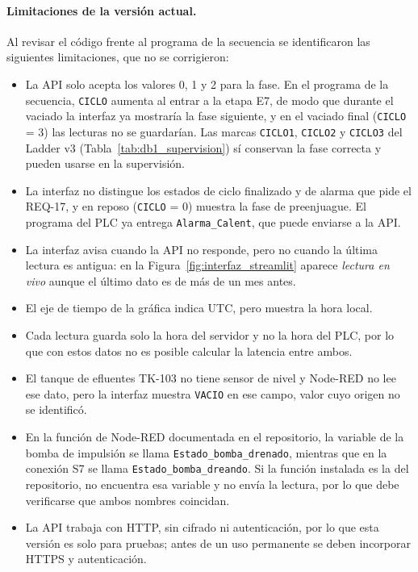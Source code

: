\paragraph{Limitaciones de la versión actual.} Al revisar el código frente al programa de la secuencia se identificaron las siguientes limitaciones, que no se corrigieron:
\begin{itemize}
\item La API solo acepta los valores 0, 1 y 2 para la fase. En el programa de la secuencia, \texttt{CICLO} aumenta al entrar a la etapa E7, de modo que durante el vaciado la interfaz ya mostraría la fase siguiente, y en el vaciado final (\texttt{CICLO} = 3) las lecturas no se guardarían. Las marcas \texttt{CICLO1}, \texttt{CICLO2} y \texttt{CICLO3} del Ladder v3 (Tabla~\ref{tab:db1_supervision}) sí conservan la fase correcta y pueden usarse en la supervisión.
\item La interfaz no distingue los estados de ciclo finalizado y de alarma que pide el REQ-17, y en reposo (\texttt{CICLO} = 0) muestra la fase de preenjuague. El programa del PLC ya entrega \texttt{Alarma\_Calent}, que puede enviarse a la API.
\item La interfaz avisa cuando la API no responde, pero no cuando la última lectura es antigua: en la Figura~\ref{fig:interfaz_streamlit} aparece \emph{lectura en vivo} aunque el último dato es de más de un mes antes.
\item El eje de tiempo de la gráfica indica UTC, pero muestra la hora local.
\item Cada lectura guarda solo la hora del servidor y no la hora del PLC, por lo que con estos datos no es posible calcular la latencia entre ambos.
\item El tanque de efluentes TK-103 no tiene sensor de nivel y Node-RED no lee ese dato, pero la interfaz muestra \texttt{VACIO} en ese campo, valor cuyo origen no se identificó.
\item En la función de Node-RED documentada en el repositorio, la variable de la bomba de impulsión se llama \texttt{Estado\_bomba\_drenado}, mientras que en la conexión S7 se llama \texttt{Estado\_bomba\_dreando}. Si la función instalada es la del repositorio, no encuentra esa variable y no envía la lectura, por lo que debe verificarse que ambos nombres coincidan.
\item La API trabaja con HTTP, sin cifrado ni autenticación, por lo que esta versión es solo para pruebas; antes de un uso permanente se deben incorporar HTTPS y autenticación.
\end{itemize}

